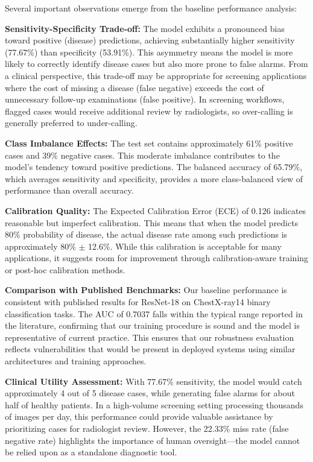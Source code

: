 \documentclass[12pt,a4paper]{article}
\begin{document}
Several important observations emerge from the baseline performance analysis:

\textbf{Sensitivity-Specificity Trade-off:} The model exhibits a pronounced bias toward positive (disease) predictions, achieving substantially higher sensitivity (77.67\%) than specificity (53.91\%). This asymmetry means the model is more likely to correctly identify disease cases but also more prone to false alarms. From a clinical perspective, this trade-off may be appropriate for screening applications where the cost of missing a disease (false negative) exceeds the cost of unnecessary follow-up examinations (false positive). In screening workflows, flagged cases would receive additional review by radiologists, so over-calling is generally preferred to under-calling.

\textbf{Class Imbalance Effects:} The test set contains approximately 61\% positive cases and 39\% negative cases. This moderate imbalance contributes to the model's tendency toward positive predictions. The balanced accuracy of 65.79\%, which averages sensitivity and specificity, provides a more class-balanced view of performance than overall accuracy.

\textbf{Calibration Quality:} The Expected Calibration Error (ECE) of 0.126 indicates reasonable but imperfect calibration. This means that when the model predicts 80\% probability of disease, the actual disease rate among such predictions is approximately 80\% $\pm$ 12.6\%. While this calibration is acceptable for many applications, it suggests room for improvement through calibration-aware training or post-hoc calibration methods.

\textbf{Comparison with Published Benchmarks:} Our baseline performance is consistent with published results for ResNet-18 on ChestX-ray14 binary classification tasks. The AUC of 0.7037 falls within the typical range reported in the literature, confirming that our training procedure is sound and the model is representative of current practice. This ensures that our robustness evaluation reflects vulnerabilities that would be present in deployed systems using similar architectures and training approaches.

\textbf{Clinical Utility Assessment:} With 77.67\% sensitivity, the model would catch approximately 4 out of 5 disease cases, while generating false alarms for about half of healthy patients. In a high-volume screening setting processing thousands of images per day, this performance could provide valuable assistance by prioritizing cases for radiologist review. However, the 22.33\% miss rate (false negative rate) highlights the importance of human oversight---the model cannot be relied upon as a standalone diagnostic tool.
\end{document}
